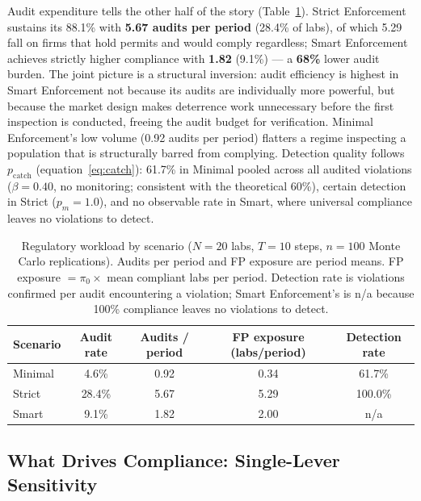 Audit expenditure tells the other half of the story (Table~\ref{tab:audit-burden}). Strict Enforcement sustains its 88.1\% with \textbf{5.67 audits per period} (28.4\% of labs), of which 5.29 fall on firms that hold permits and would comply regardless; Smart Enforcement achieves strictly higher compliance with \textbf{1.82} (9.1\%) --- a \textbf{68\%} lower audit burden. The joint picture is a structural inversion: audit efficiency is highest in Smart Enforcement not because its audits are individually more powerful, but because the market design makes deterrence work unnecessary before the first inspection is conducted, freeing the audit budget for verification. Minimal Enforcement's low volume (0.92 audits per period) flatters a regime inspecting a population that is structurally barred from complying. Detection quality follows $p_{\mathrm{catch}}$ (equation~\ref{eq:catch}): 61.7\% in Minimal pooled across all audited violations ($\beta = 0.40$, no monitoring; consistent with the theoretical 60\%), certain detection in Strict ($p_m = 1.0$), and no observable rate in Smart, where universal compliance leaves no violations to detect.

\begin{table}[htbp]
\centering
\caption{Regulatory workload by scenario ($N = 20$ labs, $T = 10$ steps,
$n = 100$ Monte Carlo replications). Audits per period and FP exposure are
period means. FP exposure $= \pi_0 \times$ mean compliant labs per period.
Detection rate is violations confirmed per audit encountering a violation;
Smart Enforcement's is n/a because 100\% compliance leaves no violations to detect.}
\label{tab:audit-burden}
\small
\begin{tabular}{@{}lcccc@{}}
\toprule
\textbf{Scenario} & \textbf{Audit rate} & \textbf{Audits / period}
  & \textbf{FP exposure (labs/period)} & \textbf{Detection rate} \\
\midrule
Minimal & 4.6\%  & 0.92 & 0.34 & 61.7\%  \\
Strict  & 28.4\% & 5.67 & 5.29 & 100.0\% \\
Smart &  9.1\% & 1.82 & 2.00 & n/a     \\
\bottomrule
\end{tabular}
\end{table}

\subsection{What Drives Compliance: Single-Lever Sensitivity}
\label{sec:results-sensitivity}

